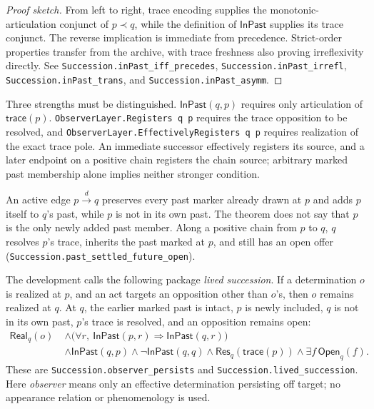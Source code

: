 \documentclass[11pt]{article}
\theoremstyle{definition}
\theoremstyle{remark}
\newcommand{\lean}[1]{\nolinkurl{#1}}
\newcommand{\Real}{\mathsf{Real}}
\newcommand{\Res}{\mathsf{Res}}
\newcommand{\Opn}{\mathsf{Open}}
\newcommand{\Trace}{\mathsf{trace}}
\begin{document}
\begin{proof}[Proof sketch]
From left to right, trace encoding supplies the monotonic-articulation conjunct
of \(p\prec q\), while the definition of \(\mathsf{InPast}\) supplies its trace
conjunct. The reverse implication is immediate from precedence. Strict-order
properties transfer from the archive, with trace freshness also proving
irreflexivity directly. See \lean{Succession.inPast_iff_precedes},
\lean{Succession.inPast_irrefl}, \lean{Succession.inPast_trans}, and
\lean{Succession.inPast_asymm}.
\end{proof}

Three strengths must be distinguished. \(\mathsf{InPast}(q,p)\) requires only
articulation of \(\Trace(p)\). \lean{ObserverLayer.Registers q p} requires the
trace opposition to be resolved, and
\lean{ObserverLayer.EffectivelyRegisters q p} requires realization of the exact
trace pole. An immediate successor effectively registers its source, and a
later endpoint on a positive chain registers the chain source; arbitrary marked
past membership alone implies neither stronger condition.

An active edge \(p\xrightarrow{d}q\) preserves every past marker already drawn
at \(p\) and adds \(p\) itself to \(q\)'s past, while \(p\) is not in its own
past. The theorem does not say that \(p\) is the only newly added past member.
Along a positive chain from \(p\) to \(q\), \(q\) resolves \(p\)'s trace,
inherits the past marked at \(p\), and still has an open offer
(\lean{Succession.past_settled_future_open}).

The development calls the following package \emph{lived succession}. If a
determination \(o\) is realized at \(p\), and an act targets an opposition other
than \(o\)'s, then \(o\) remains realized at \(q\). At \(q\), the earlier
marked past is intact, \(p\) is newly included, \(q\) is not in its own
past, \(p\)'s trace is resolved, and an opposition remains open:
\[
\begin{split}
  \Real_q(o)\;&\land
  \bigl(\forall r,\ \mathsf{InPast}(p,r)\Rightarrow
                       \mathsf{InPast}(q,r)\bigr)\\
  &\land\mathsf{InPast}(q,p)
  \land\neg\mathsf{InPast}(q,q)
  \land\Res_q(\Trace(p))
  \land\exists f\,\Opn_q(f).
\end{split}
\]
These are \lean{Succession.observer_persists} and
\lean{Succession.lived_succession}. Here \emph{observer} means only an
effective determination persisting off target; no appearance relation or
phenomenology is used.
\end{document}

